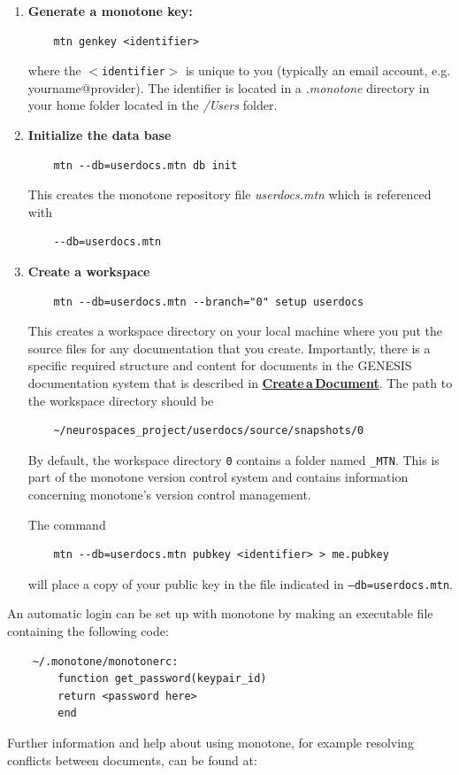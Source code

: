 \documentclass[12pt]{article}
\begin{document}
\begin{enumerate}

\item {\bf Generate a monotone key:} 
\begin{verbatim}
    mtn genkey <identifier>
\end{verbatim}
where the {\tt $<$identifier$>$} is unique to you (typically an email account, e.g. yourname@provider). The identifier is located in a {\it .monotone} directory in your home folder located in the {\it /Users} folder.

\item {\bf Initialize the data base}
\begin{verbatim}
    mtn --db=userdocs.mtn db init
\end{verbatim}
This creates the monotone repository file {\it userdocs.mtn} which is referenced with
\begin{verbatim}
    --db=userdocs.mtn
\end{verbatim}

\item {\bf Create a workspace}
\begin{verbatim}
    mtn --db=userdocs.mtn --branch="0" setup userdocs
\end{verbatim}
This creates a workspace directory on your local machine where you put the source files for any documentation that you create. Importantly, there is a specific required structure and content for documents in the GENESIS documentation system that is described in \href{../document-create/document-create.tex}{\bf Create\,a\,Document}. The path to the workspace directory should be
\begin{verbatim}
    ~/neurospaces_project/userdocs/source/snapshots/0
\end{verbatim}
By default, the workspace directory {\tt 0} contains a folder named {\tt \_MTN}. This is part of the monotone version control system and contains information concerning monotone's version control management.

The command
\begin{verbatim}
    mtn --db=userdocs.mtn pubkey <identifier> > me.pubkey
\end{verbatim}
will place a copy of your public key in the file indicated in {\tt --db=userdocs.mtn}.
\end{enumerate}
An automatic login can be set up with monotone by making an executable file containing the following code:
\begin{verbatim}
    ~/.monotone/monotonerc:
        function get_password(keypair_id)
        return <password here>
        end

\end{verbatim}
Further information and help about using monotone, for example resolving conflicts between documents, can be found at:
\end{document}
